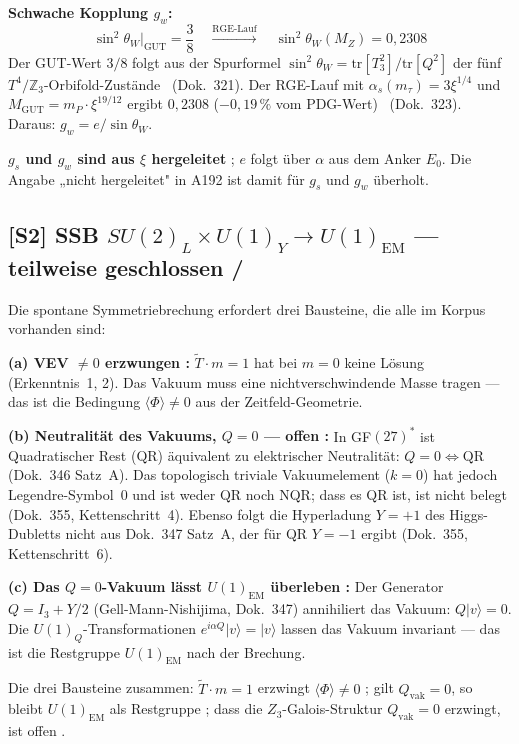 \textbf{Schwache Kopplung $g_w$:}
\begin{equation}
  \sin^2\theta_W\big|_\text{GUT} = \frac{3}{8}
  \quad\xrightarrow{\text{RGE-Lauf}}\quad
  \sin^2\theta_W(M_Z) = 0{,}2308
  \label{eq:theta_w}
\end{equation}
Der GUT-Wert $3/8$ folgt aus der Spurformel
$\sin^2\theta_W = \mathrm{tr}[T_3^2]/\mathrm{tr}[Q^2]$ der fünf
$T^4/\mathbb{Z}_3$-Orbifold-Zustände \BM\ (Dok.~321).
Der RGE-Lauf mit $\alpha_s(m_\tau)=3\xi^{1/4}$ und
$M_\text{GUT}=m_P\cdot\xi^{19/12}$ ergibt $0{,}2308$
($-0{,}19\,\%$ vom PDG-Wert) \KM\ (Dok.~323). Daraus:
$g_w = e/\sin\theta_W$.

\textbf{$g_s$ und $g_w$ sind aus $\xi$ hergeleitet} \KM; $e$ folgt über $\alpha$ aus
dem Anker $E_0$. Die Angabe „nicht hergeleitet" in A192 ist damit für $g_s$ und
$g_w$ überholt.

\subsection*{[S2] SSB $SU(2)_L\times U(1)_Y\to U(1)_\text{EM}$ --- teilweise
  geschlossen \BM/\SM}

Die spontane Symmetriebrechung erfordert drei Bausteine, die alle im
Korpus vorhanden sind:

\textbf{(a) VEV $\neq 0$ erzwungen \BM:}
$\tilde{T}\cdot m=1$ hat bei $m=0$ keine Lösung (Erkenntnis~1, 2).
Das Vakuum muss eine nichtverschwindende Masse tragen --- das ist
die Bedingung $\langle\Phi\rangle \neq 0$ aus der Zeitfeld-Geometrie.

\textbf{(b) Neutralität des Vakuums, $Q=0$ --- offen \SM:}
In GF$(27)^*$ ist Quadratischer Rest ($\mathrm{QR}$) äquivalent zu
elektrischer Neutralität: $Q=0 \iff \mathrm{QR}$ (Dok.~346 Satz~A).
Das topologisch triviale Vakuumelement ($k=0$) hat jedoch Legendre-Symbol~$0$
und ist weder QR noch NQR; dass es QR ist, ist nicht belegt (Dok.~355,
Kettenschritt~4). Ebenso folgt die Hyperladung $Y=+1$ des Higgs-Dubletts nicht
aus Dok.~347 Satz~A, der für QR $Y=-1$ ergibt (Dok.~355, Kettenschritt~6).

\textbf{(c) Das $Q=0$-Vakuum lässt $U(1)_\text{EM}$ überleben \BM:}
Der Generator $Q = I_3 + Y/2$ (Gell-Mann-Nishijima, Dok.~347) annihiliert
das Vakuum: $Q|v\rangle = 0$. Die $U(1)_Q$-Transformationen
$e^{i\alpha Q}|v\rangle = |v\rangle$ lassen das Vakuum invariant ---
das ist die Restgruppe $U(1)_\text{EM}$ nach der Brechung.

Die drei Bausteine zusammen: $\tilde{T}\cdot m=1$ erzwingt
$\langle\Phi\rangle\neq0$ \BM; gilt $Q_\text{vak}=0$, so bleibt $U(1)_\text{EM}$ als
Restgruppe \BM; dass die $Z_3$-Galois-Struktur $Q_\text{vak}=0$ erzwingt, ist
offen \SM.

